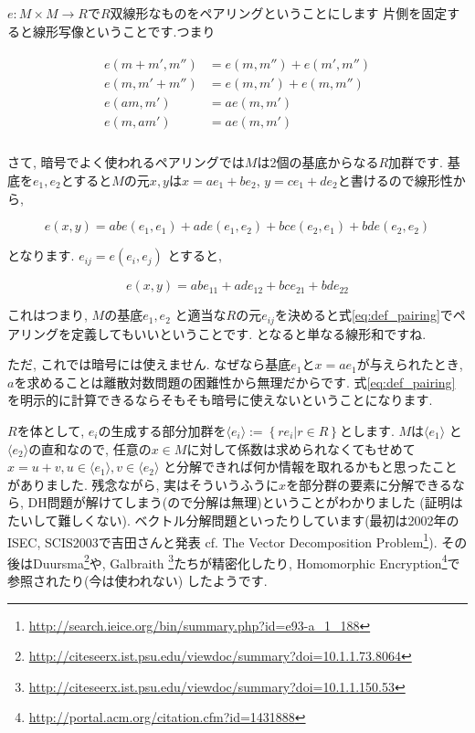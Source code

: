 \documentclass{jsarticle}
\theoremstyle{definition}
\numberwithin{theorem}{section}
\begin{document}
$e: M\times M \rightarrow R$で$R$双線形なものをペアリングということにします  片側を固定すると線形写像ということです.つまり

\begin{eqnarray*}
\begin{aligned}
e(m+m', m'') &= e(m, m'') + e(m', m'')\\
e(m, m'+m'') &= e(m, m') + e(m, m'')\\
e(am, m') &= ae(m, m')\\
e(m, am') &= ae(m, m')\\
\end{aligned}
\end{eqnarray*}

さて, 暗号でよく使われるペアリングでは$M$は2個の基底からなる$R$加群です. 基底を$e_1, e_2$とすると$M$の元$x, y$は$x = ae_1+be_2$, 
$y = ce_1 + de_2$と書けるので線形性から, 

$$
e(x, y) = ab e(e_1, e_1) + ad e(e_1, e_2) + bc e(e_2, e_1) + bd e(e_2, e_2)
$$

となります. $e_{ij} = e(e_i, e_j)$ とすると, 

\begin{equation}
\label{eq:def_pairing}
e(x, y) = ab e_{11} + ad e_{12} + bc e_{21} + bd e_{22}
\end{equation}

これはつまり, $M$の基底$e_1, e_2$ と適当な$R$の元$e_{ij}$を決めると式\ref{eq:def_pairing}でペアリングを定義してもいいということです. となると単なる線形和ですね.

ただ, これでは暗号には使えません. なぜなら基底$e_1$と$x = ae_1$が与えられたとき, $a$を求めることは離散対数問題の困難性から無理だからです. 
式\ref{eq:def_pairing}を明示的に計算できるならそもそも暗号に使えないということになります. 

$R$を体として, $e_i$の生成する部分加群を$\langle e_i \rangle := \left\{re_i | r \in R\right\}$とします. $M$は$\langle e_1\rangle$
と$\langle e_2\rangle$の直和なので, 任意の$x\in M$に対して係数は求められなくてもせめて$x = u+v, u \in \langle e_1\rangle, v \in \langle e_2\rangle$
と分解できれば何か情報を取れるかもと思ったことがありました. 残念ながら, 実はそういうふうに$x$を部分群の要素に分解できるなら, DH問題が解けてしまう(ので分解は無理)ということがわかりました
(証明はたいして難しくない). ベクトル分解問題といったりしています(最初は2002年のISEC, SCIS2003で吉田さんと発表 cf. 
The Vector Decomposition Problem\footnote{\url{http://search.ieice.org/bin/summary.php?id=e93-a_1_188}}). 
その後はDuursma\footnote{\url{http://citeseerx.ist.psu.edu/viewdoc/summary?doi=10.1.1.73.8064}}や, Galbraith
\footnote{\url{http://citeseerx.ist.psu.edu/viewdoc/summary?doi=10.1.1.150.53}}たちが精密化したり, 
Homomorphic Encryption\footnote{\url{http://portal.acm.org/citation.cfm?id=1431888}}で参照されたり(今は使われない)
したようです. 
\end{document}
